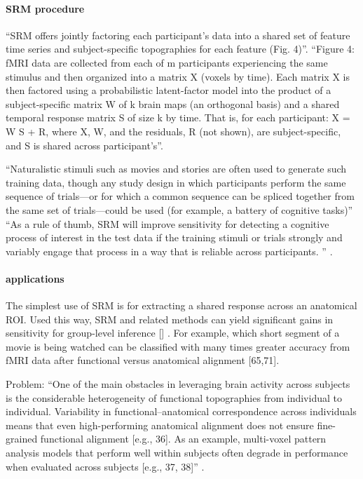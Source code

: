 \paragraph{SRM procedure}

%
``SRM offers jointly factoring each participant's data into a shared set of
feature time series and subject-specific topographies for each feature (Fig.
4)''\citep{cohen2017computational}.
%
``Figure 4: fMRI data are collected from each of m participants experiencing the
same stimulus and then organized into a matrix X (voxels by time). Each matrix X
is then factored using a probabilistic latent-factor model into the product of a
subject-specific matrix W of k brain maps (an orthogonal basis) and a shared
temporal response matrix S of size k by time. That is, for each participant: X =
W S + R, where X, W, and the residuals, R (not shown), are subject-specific, and
S is shared across participant's''\citep{cohen2017computational}.

``Naturalistic stimuli such as movies and stories are often used to generate
such training data, though any study design in which participants perform the
same sequence of trials—or for which a common sequence can be spliced together
from the same set of trials—could be used (for example, a battery of cognitive
tasks)'' \citep{cohen2017computational}
%
``As a rule of thumb, SRM will improve sensitivity for detecting a cognitive
process of interest in the test data if the training stimuli or trials strongly
and variably engage that process in a way that is reliable across participants.
'' \citep{cohen2017computational}.

\paragraph{applications}
%
The simplest use of SRM is for extracting a shared response across an anatomical
ROI. Used this way, SRM and related methods can yield significant gains in
sensitivity for group-level inference [\citep{chen2015reduced,haxby2011common}]
\citep{cohen2017computational}.
%
For example, which short segment of a movie is being watched can be classified
with many times greater accuracy from fMRI data after functional versus
anatomical alignment [65,71]\citep{cohen2017computational}.


%
Problem: ``One of the main obstacles in leveraging brain activity across
subjects is the considerable heterogeneity of functional topographies from
individual to individual. Variability in functional–anatomical correspondence
across individuals means that even high-performing anatomical alignment does not
ensure fine-grained functional alignment [e.g., 36]. As an example, multi-voxel
pattern analysis models that perform well within subjects often degrade in
performance when evaluated across subjects [e.g., 37, 38]''
\citep{kumar2020brainiak}.

